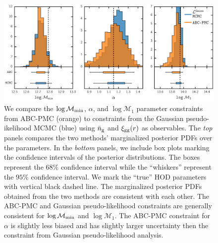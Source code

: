 \begin{figure}
\includegraphics[width=1.\textwidth]{figures/abc/paper_ABCvsMCMC_nbarxi.pdf}
\caption{\label{fig:hist_nbarxi} 
We compare the $\log \mathcal{M}_{\rm min}$, $\alpha$, and $\log \mathcal{M}_{1}$ parameter 
constraints from ABC-PMC (orange) to constraints from the Gaussian pseudo-ikelihood MCMC (blue) 
using $\bar{n}_{\mathrm{g}}$ and $\xi_{\mathrm{gg}}(r)$ as observables. The \emph{top} panels compares the two methods' 
marginalized posterior PDFs over the parameters. In the \emph{bottom} panels, we include box 
plots marking the confidence intervals of the posterior distributions. The boxes represent the 
$68\%$ confidence interval while the ``whiskers'' represent the $95\%$ confidence interval. We mark 
the ``true'' HOD parameters with vertical black dashed line. The marginalized posterior PDFs 
obtained from the two methods are consistent with each other. The ABC-PMC and Gaussian pseudo-likelihood
constraints are generally consistent for $\log \mathcal{M}_{\rm min}$ and $\log \mathcal{M}_{1}$. 
The ABC-PMC constraint for $\alpha$ is slightly less biased and has slightly larger uncertainty
then the constraint from Gaussian pseudo-likelihood analysis.} 
\end{figure}

